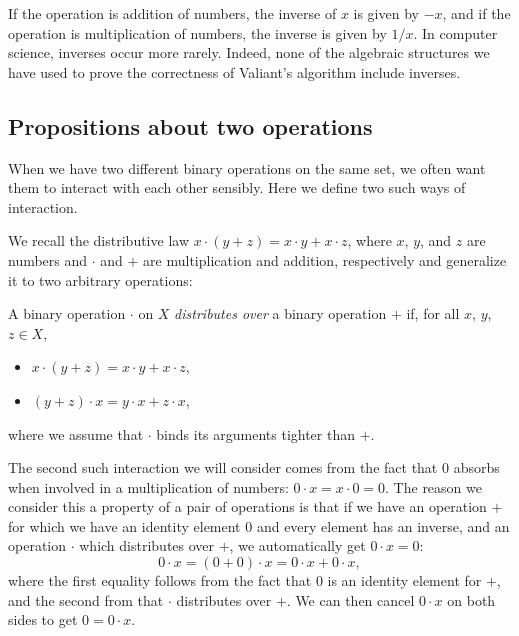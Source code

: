 If the operation is addition of numbers, the inverse of $x$ is given by $-x$, and if the operation is multiplication of numbers, the inverse is given by $1/x$. In computer science, inverses occur more rarely.
Indeed, none of the algebraic structures we have used to prove the correctness of Valiant's algorithm include inverses.

\subsection{Propositions about two operations}
\label{two-operations}
When we have two different binary operations on the same set, we often want them to interact with each other sensibly. Here we define two such ways of interaction.

We recall the distributive law $x\cdot(y + z) = x\cdot y + x\cdot z$, where $x$, $y$, and $z$ are numbers and $\cdot$ and $+$ are multiplication and addition, respectively and generalize it to two arbitrary operations:
\begin{Definition}
  A binary operation $\cdot$ on $X$ \emph{distributes over} a binary operation $+$ if, for all $x$, $y$, $z \in X$,
  \begin{itemize}
  \item $x \cdot (y + z) = x \cdot y + x \cdot z$,
  \item $(y + z) \cdot x = y \cdot x + z \cdot x$,
  \end{itemize}
  where we assume that $\cdot$ binds its arguments tighter than $+$.
\end{Definition}

\label{zero-element}
The second such interaction we will consider comes from the fact that $0$ absorbs when involved in a multiplication of numbers: $0 \cdot x = x \cdot 0 = 0$. The reason we consider this a property of a pair of operations is that if we have an operation $+$ for which we have an identity element $0$ and every element has an inverse, and an operation $\cdot$ which distributes over $+$, we automatically get $0 \cdot x = 0$:
\begin{equation*}
  0 \cdot x = (0 + 0) \cdot x = 0 \cdot x + 0 \cdot x,
\end{equation*}
where the first equality follows from the fact that $0$ is an identity element for $+$, and the second from that $\cdot$ distributes over $+$. We can then cancel $0 \cdot x$ on both sides to get $0 = 0 \cdot x$.

